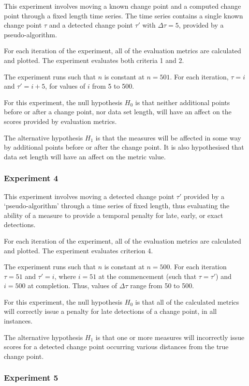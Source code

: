 \documentclass{uvamscse}	%
\begin{document}
This experiment involves moving a known change point and a computed change point through a fixed length time series. The time series contains a single known change point $\tau$ and a detected change point $\tau'$ with $\Delta \tau = 5$, provided by a pseudo-algorithm.

For each iteration of the experiment, all of the evaluation metrics are calculated and plotted. The experiment evaluates both criteria 1 and 2.

The experiment runs such that $n$ is constant at $n=501$. For each iteration, $\tau = i$ and $\tau' = i + 5$, for values of $i$ from 5 to 500.

For this experiment, the null hypothesis $H_0$ is that neither additional points before or after a change point, nor data set length, will have an affect on the scores provided by evaluation metrics.

The alternative hypothesis $H_1$ is that the measures will be affected in some way by additional points before or after the change point. It is also hypothesised that data set length will have an affect on the metric value.

\subsubsection{Experiment 4}

This experiment involves moving a detected change point $\tau'$ provided by a `pseudo-algorithm' through a time series of fixed length, thus evaluating the ability of a measure to provide a temporal penalty for late, early, or exact detections.

For each iteration of the experiment, all of the evaluation metrics are calculated and plotted. The experiment evaluates criterion 4.

The experiment runs such that $n$ is constant at $n=500$. For each iteration $\tau = 51$ and $\tau' = i$, where $i = 51$ at the commencement (such that $\tau = \tau'$) and $i = 500$ at completion. Thus, values of $\Delta \tau$ range from 50 to 500.

For this experiment, the null hypothesis $H_0$ is that all of the calculated metrics will correctly issue a penalty for late detections of a change point, in all instances.

The alternative hypothesis $H_1$ is that one or more measures will incorrectly issue scores for a detected change point occurring various distances from the true change point.

\subsubsection{Experiment 5}
\end{document}
